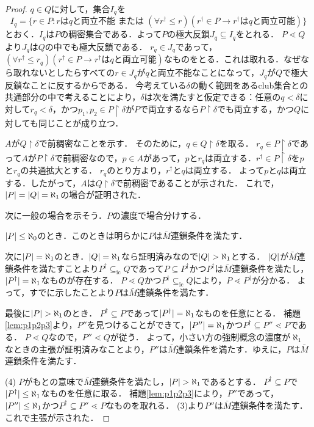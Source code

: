 \documentclass[uplatex]{jsarticle}
\newcommand{\restrict}{\upharpoonright}
\newcommand{\subsetic}{\subseteq_{\mathrm{ic}}}
\DeclarePairedDelimiter\abs{\lvert}{\rvert}
\renewcommand\subset{\subseteq}
\theoremstyle{definition}
\begin{document}
\begin{proof}
		$q \in Q$に対して，集合$I_q$を
		\[
		I_q = \{ r \in P : \text{$r$は$q$と両立不能 または } (\forall r^\dagger \le r)(r^\dagger \in P \rightarrow \text{$r^\dagger$は$q$と両立可能} )\}
		\]
		とおく．$I_q$は$P$の稠密集合である．よって$P$の極大反鎖$J_q \subset I_q$をとれる．
		$P \lessdot Q$より$J_q$は$Q$の中でも極大反鎖である．
		$r_q \in J_q$であって，$(\forall r^\dagger \le r_q)(r^\dagger \in P \rightarrow \text{$r^\dagger$は$q$と両立可能})$なものをとる．これは取れる．なぜなら取れないとしたらすべての$r \in J_q$が$q$と両立不能なことになって，$J_q$が$Q$で極大反鎖なことに反するからである．
		今考えている$\delta$の動く範囲をあるclub集合との共通部分の中で考えることにより，$\delta$は次を満たすと仮定できる：任意の$q < \delta$に対して$r_q < \delta$，かつ$p_1, p_2 \in P \restrict \delta$が$P$で両立するなら$P \restrict \delta$でも両立する，かつ$Q$に対しても同じことが成り立つ．
		
		$A$が$Q \restrict \delta$で前稠密なことを示す．
		そのために，$q \in Q \restrict \delta$を取る．
		$r_q \in P \restrict \delta$であって$A$が$P \restrict \delta$で前稠密なので，$p \in A$があって，$p$と$r_q$は両立する．$r^\dagger \in P \restrict \delta$を$p$と$r_q$の共通拡大とする．
		$r_q$のとり方より，$r^\dagger$と$q$は両立する．
		よって$p$と$q$は両立する．したがって，$A$は$Q \restrict \delta$で前稠密であることが示された．
		これで，$\abs{P} = \abs{Q} = \aleph_1$の場合が証明された．
		
		次に一般の場合を示そう．$P$の濃度で場合分けする．
		
		$\abs{P} \le \aleph_0$のとき．このときは明らかに$P$は$\bar{M}$連鎖条件を満たす．
		
		次に$\abs{P} = \aleph_1$のとき．$\abs{Q} = \aleph_1$なら証明済みなので$\abs{Q} > \aleph_1$とする．
		$\abs{Q}$が$\bar{M}$連鎖条件を満たすことより$P^\dagger \subsetic Q$であって$P \subset P^\dagger$かつ$P^\dagger$は$\bar{M}$連鎖条件を満たし，$\abs{P^\dagger} = \aleph_1$なものが存在する．
		$P \lessdot Q$かつ$P^\dagger \subsetic Q$により，$P \lessdot P^\dagger$が分かる．
		よって，すでに示したことより$P$は$\bar{M}$連鎖条件を満たす．
		
		最後に$\abs{P} > \aleph_1$のとき．
		$P^\dagger \subset P$であって$\abs{P^\dagger} = \aleph_1$なものを任意にとる．
		補題 \ref{lem:p1p2p3}より，$P''$を見つけることができて，$\abs{P''} = \aleph_1$かつ$P^\dagger \subset P'' \lessdot P$である．
		$P \lessdot Q$なので，$P'' \lessdot Q$が従う．
		よって，小さい方の強制概念の濃度が$\aleph_1$なときの主張が証明済みなことより，$P''$は$\bar{M}$連鎖条件を満たす．ゆえに，$P$は$\bar{M}$連鎖条件を満たす．
		
		(4) $P$がもとの意味で$\bar{M}$連鎖条件を満たし，$\abs{P} > \aleph_1$であるとする．
		$P^\dagger \subset P$で$\abs{P^\dagger} \le \aleph_1$なものを任意に取る．
		補題\ref{lem:p1p2p3}により，$P''$であって，$\abs{P''} 	\le \aleph_1$かつ$P^\dagger \subset P'' \lessdot P$なものを取れる．
		(3)より$P''$は$\bar{M}$連鎖条件を満たす．これで主張が示された．
	\end{proof}
	
	
	\nocite{*}
	\printbibliography[title={参考文献}]
	
\end{document}
